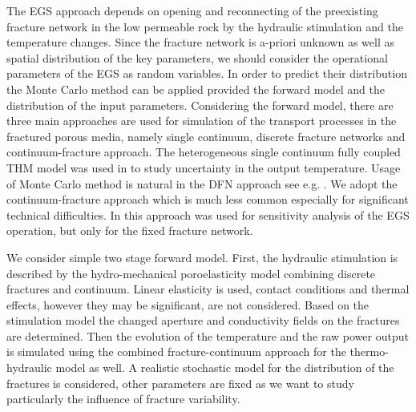 \documentclass{article}
\begin{document}
The EGS approach depends on opening and reconnecting of the preexisting fracture network in the low permeable rock by the hydraulic stimulation and the temperature changes. Since the fracture network is a-priori unknown as well as spatial distribution of the key parameters, we should consider the operational parameters of the EGS as random variables. In order to predict their distribution the Monte Carlo method can be applied provided the forward model and the distribution of the input parameters. Considering the forward model, there are three main approaches are used for simulation of the transport processes in the fractured porous media, namely single continuum, discrete fracture networks and continuum-fracture approach.
The heterogeneous single continuum fully coupled THM model was used  in \cite{Watanabe2009} to study uncertainty in the output temperature. Usage of Monte Carlo method is natural in the DFN approach see e.g. \cite{Ezzedine2008}. 
We adopt the continuum-fracture approach which is much less common especially for significant technical difficulties. In \cite{Doonechaly2016} this approach was used for sensitivity analysis of the EGS operation, but only for the fixed fracture network. 

We consider simple two stage forward model. First, the hydraulic stimulation is described by the hydro-mechanical poroelasticity model combining discrete fractures and continuum. Linear elasticity is used, contact conditions and thermal effects, however they may be significant, are not considered. Based on the stimulation model the changed aperture and conductivity fields on the fractures are determined. Then the evolution of the temperature and the raw power output is simulated using the combined fracture-continuum approach for the thermo-hydraulic model as well. 
A realistic stochastic model for the distribution of the fractures is considered, other parameters are fixed as we want to study particularly the influence of fracture variability. 
\end{document}
